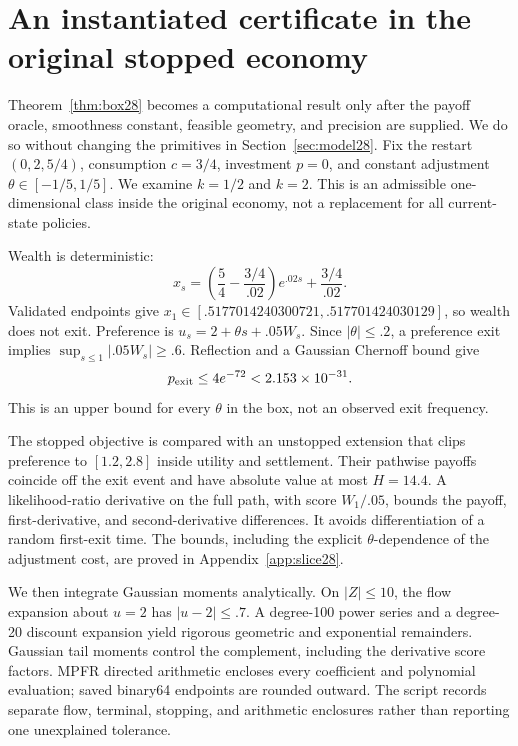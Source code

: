 \section{An instantiated certificate in the original stopped economy}\label{sec:slice28}
Theorem~\ref{thm:box28} becomes a computational result only after the payoff oracle, smoothness constant, feasible geometry, and precision are supplied. We do so without changing the primitives in Section~\ref{sec:model28}. Fix the restart $(0,2,5/4)$, consumption $c=3/4$, investment $p=0$, and constant adjustment $\theta\in[-1/5,1/5]$. We examine $k=1/2$ and $k=2$. This is an admissible one-dimensional class inside the original economy, not a replacement for all current-state policies.

Wealth is deterministic:
\begin{equation}
 x_s=\left(\frac54-\frac{3/4}{.02}\right)e^{.02s}+\frac{3/4}{.02}.
\end{equation}
Validated endpoints give $x_1\in[.5177014240300721,.517701424030129]$, so wealth does not exit. Preference is $u_s=2+\theta s+.05W_s$. Since $|\theta|\le.2$, a preference exit implies $\sup_{s\le1}|.05W_s|\ge.6$. Reflection and a Gaussian Chernoff bound give
\begin{equation}\label{eq:exit28}
 p_{\rm exit}\le4e^{-72}<2.153\times10^{-31}.
\end{equation}
This is an upper bound for every $\theta$ in the box, not an observed exit frequency.

The stopped objective is compared with an unstopped extension that clips preference to $[1.2,2.8]$ inside utility and settlement. Their pathwise payoffs coincide off the exit event and have absolute value at most $H=14.4$. A likelihood-ratio derivative on the full path, with score $W_1/.05$, bounds the payoff, first-derivative, and second-derivative differences. It avoids differentiation of a random first-exit time. The bounds, including the explicit $\theta$-dependence of the adjustment cost, are proved in Appendix~\ref{app:slice28}.

We then integrate Gaussian moments analytically. On $|Z|\le10$, the flow expansion about $u=2$ has $|u-2|\le.7$. A degree-100 power series and a degree-20 discount expansion yield rigorous geometric and exponential remainders. Gaussian tail moments control the complement, including the derivative score factors. MPFR directed arithmetic encloses every coefficient and polynomial evaluation; saved binary64 endpoints are rounded outward. The script records separate flow, terminal, stopping, and arithmetic enclosures rather than reporting one unexplained tolerance.

